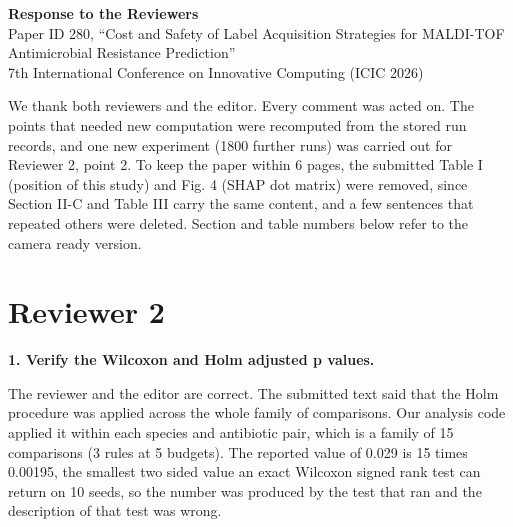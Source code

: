 \documentclass[11pt,a4paper]{article}
\newcommand{\pt}[1]{\textbf{#1}}
\begin{document}
\begin{center}
{\large\textbf{Response to the Reviewers}}\\[4pt]
Paper ID 280, ``Cost and Safety of Label Acquisition Strategies for MALDI-TOF Antimicrobial Resistance Prediction''\\
7th International Conference on Innovative Computing (ICIC 2026)
\end{center}

We thank both reviewers and the editor. Every comment was acted on. The points that needed new computation were
recomputed from the stored run records, and one new experiment (1800 further runs) was carried out for Reviewer 2,
point 2. To keep the paper within 6 pages, the submitted Table I (position of this study) and Fig. 4 (SHAP dot matrix)
were removed, since Section II-C and Table III carry the same content, and a few sentences that repeated others were
deleted. Section and table numbers below refer to the camera ready version.

\section*{Reviewer 2}

\pt{1. Verify the Wilcoxon and Holm adjusted p values.}

The reviewer and the editor are correct. The submitted text said that the Holm procedure was applied across the whole
family of comparisons. Our analysis code applied it within each species and antibiotic pair, which is a family of 15
comparisons (3 rules at 5 budgets). The reported value of 0.029 is 15 times 0.00195, the smallest two sided value an
exact Wilcoxon signed rank test can return on 10 seeds, so the number was produced by the test that ran and the
description of that test was wrong.
\end{document}
